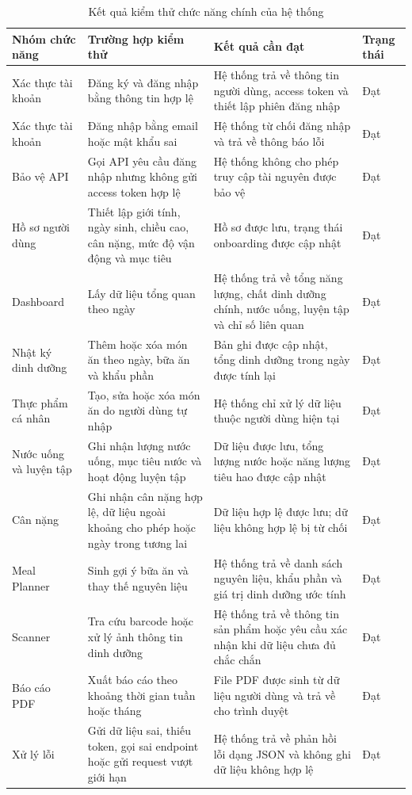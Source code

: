 \documentclass[12pt, a4paper]{report}
\begin{document}
\begin{table}[htbp]
\centering
\caption{Kết quả kiểm thử chức năng chính của hệ thống}
\begin{tabular}{|p{3cm}|p{3cm}|p{4cm}|p{5cm}|}
\hline
\textbf{Nhóm chức năng} & \textbf{Trường hợp kiểm thử} & \textbf{Kết quả cần đạt} & \textbf{Trạng thái} \\
\hline
Xác thực tài khoản & Đăng ký và đăng nhập bằng thông tin hợp lệ & Hệ thống trả về thông tin người dùng, access token và thiết lập phiên đăng nhập & Đạt \\
\hline
Xác thực tài khoản & Đăng nhập bằng email hoặc mật khẩu sai & Hệ thống từ chối đăng nhập và trả về thông báo lỗi & Đạt \\
\hline
Bảo vệ API & Gọi API yêu cầu đăng nhập nhưng không gửi access token hợp lệ & Hệ thống không cho phép truy cập tài nguyên được bảo vệ & Đạt \\
\hline
Hồ sơ người dùng & Thiết lập giới tính, ngày sinh, chiều cao, cân nặng, mức độ vận động và mục tiêu & Hồ sơ được lưu, trạng thái onboarding được cập nhật & Đạt \\
\hline
Dashboard & Lấy dữ liệu tổng quan theo ngày & Hệ thống trả về tổng năng lượng, chất dinh dưỡng chính, nước uống, luyện tập và chỉ số liên quan & Đạt \\
\hline
Nhật ký dinh dưỡng & Thêm hoặc xóa món ăn theo ngày, bữa ăn và khẩu phần & Bản ghi được cập nhật, tổng dinh dưỡng trong ngày được tính lại & Đạt \\
\hline
Thực phẩm cá nhân & Tạo, sửa hoặc xóa món ăn do người dùng tự nhập & Hệ thống chỉ xử lý dữ liệu thuộc người dùng hiện tại & Đạt \\
\hline
Nước uống và luyện tập & Ghi nhận lượng nước uống, mục tiêu nước và hoạt động luyện tập & Dữ liệu được lưu, tổng lượng nước hoặc năng lượng tiêu hao được cập nhật & Đạt \\
\hline
Cân nặng & Ghi nhận cân nặng hợp lệ, dữ liệu ngoài khoảng cho phép hoặc ngày trong tương lai & Dữ liệu hợp lệ được lưu; dữ liệu không hợp lệ bị từ chối & Đạt \\
\hline
Meal Planner & Sinh gợi ý bữa ăn và thay thế nguyên liệu & Hệ thống trả về danh sách nguyên liệu, khẩu phần và giá trị dinh dưỡng ước tính & Đạt \\
\hline
Scanner & Tra cứu barcode hoặc xử lý ảnh thông tin dinh dưỡng & Hệ thống trả về thông tin sản phẩm hoặc yêu cầu xác nhận khi dữ liệu chưa đủ chắc chắn & Đạt \\
\hline
Báo cáo PDF & Xuất báo cáo theo khoảng thời gian tuần hoặc tháng & File PDF được sinh từ dữ liệu người dùng và trả về cho trình duyệt & Đạt \\
\hline
Xử lý lỗi & Gửi dữ liệu sai, thiếu token, gọi sai endpoint hoặc gửi request vượt giới hạn & Hệ thống trả về phản hồi lỗi dạng JSON và không ghi dữ liệu không hợp lệ & Đạt \\
\hline
\hline
\hline
\end{tabular}
\end{table}
\end{document}

